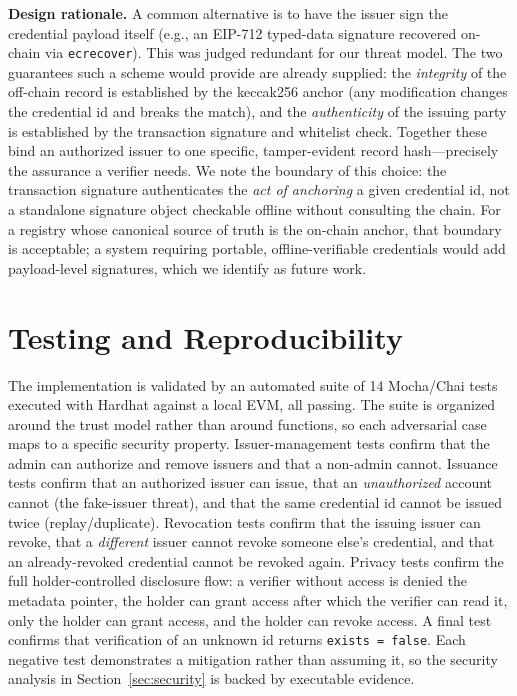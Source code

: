 \documentclass[conference]{IEEEtran}
\begin{document}
\textbf{Design rationale.} A common alternative is to have the issuer sign the credential payload itself (e.g., an EIP-712 typed-data signature recovered on-chain via \texttt{ecrecover}). This was judged redundant for our threat model. The two guarantees such a scheme would provide are already supplied: the \emph{integrity} of the off-chain record is established by the keccak256 anchor (any modification changes the credential id and breaks the match), and the \emph{authenticity} of the issuing party is established by the transaction signature and whitelist check. Together these bind an authorized issuer to one specific, tamper-evident record hash---precisely the assurance a verifier needs. We note the boundary of this choice: the transaction signature authenticates the \emph{act of anchoring} a given credential id, not a standalone signature object checkable offline without consulting the chain. For a registry whose canonical source of truth is the on-chain anchor, that boundary is acceptable; a system requiring portable, offline-verifiable credentials would add payload-level signatures, which we identify as future work.

\section{Testing and Reproducibility}

The implementation is validated by an automated suite of 14 Mocha/Chai tests executed with Hardhat against a local EVM, all passing. The suite is organized around the trust model rather than around functions, so each adversarial case maps to a specific security property. Issuer-management tests confirm that the admin can authorize and remove issuers and that a non-admin cannot. Issuance tests confirm that an authorized issuer can issue, that an \emph{unauthorized} account cannot (the fake-issuer threat), and that the same credential id cannot be issued twice (replay/duplicate). Revocation tests confirm that the issuing issuer can revoke, that a \emph{different} issuer cannot revoke someone else's credential, and that an already-revoked credential cannot be revoked again. Privacy tests confirm the full holder-controlled disclosure flow: a verifier without access is denied the metadata pointer, the holder can grant access after which the verifier can read it, only the holder can grant access, and the holder can revoke access. A final test confirms that verification of an unknown id returns \texttt{exists = false}. Each negative test demonstrates a mitigation rather than assuming it, so the security analysis in Section~\ref{sec:security} is backed by executable evidence.
\end{document}
